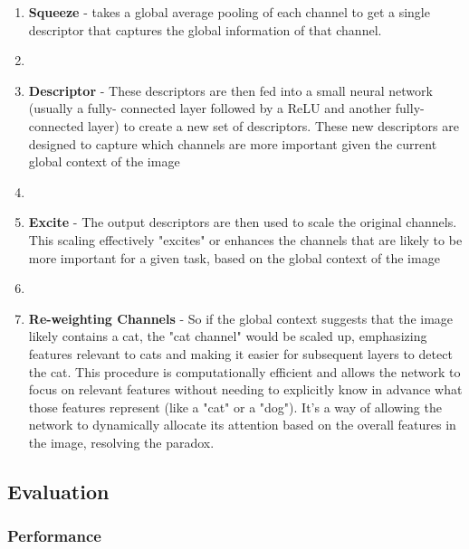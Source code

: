 \documentclass[11pt]{article}
\begin{document}
\begin{enumerate}
    \item \textbf{Squeeze} -  takes a global average pooling of each channel to get a single
    descriptor that captures the global information of that channel.
    \item \item \textbf{Descriptor} - These descriptors are then fed into a small neural network (usually a fully-
    connected layer followed by a ReLU and another fully-connected layer) to create a new
    set of descriptors. These new descriptors are designed to capture which channels are
    more important given the current global context of the image
    \item \item \textbf{Excite} - The output descriptors are then used to scale the original channels. This scaling
    effectively "excites" or enhances the channels that are likely to be more important for a
    given task, based on the global context of the image
    \item \item \textbf{Re-weighting Channels} - So if the global context suggests that the image likely contains
    a cat, the "cat channel" would be scaled up, emphasizing features relevant to cats and
    making it easier for subsequent layers to detect the cat.
    This procedure is computationally efficient and allows the network to focus on relevant
    features without needing to explicitly know in advance what those features represent
    (like a "cat" or a "dog"). It's a way of allowing the network to dynamically allocate its
    attention based on the overall features in the image, resolving the paradox.
\end{enumerate}

\subsection{Evaluation}

\subsubsection{Performance}
\end{document}
